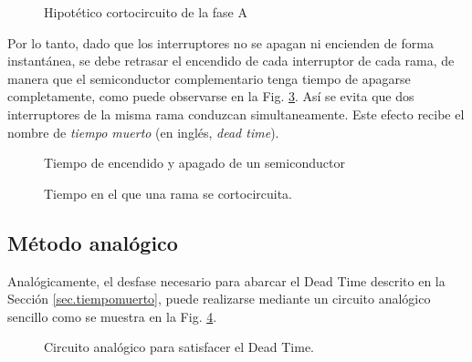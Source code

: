 \documentclass{report}
\begin{document}
\begin{figure}[ht]
    \begin{center}
    \end{center}
    \caption{Hipotético cortocircuito de la fase A}
    \label{fig.cortocircuitodefases}
    \end{figure}
    
Por lo tanto, dado que los interruptores no se apagan ni encienden de forma instantánea, se debe retrasar el encendido de cada interruptor de cada rama, de manera que el semiconductor complementario tenga tiempo de apagarse completamente, como puede observarse en la Fig. \ref{fig.cortocircuitodefasesdeadtime}. Así se evita que dos interruptores de la misma rama conduzcan simultaneamente. Este efecto recibe el nombre de \textit{tiempo muerto} (en inglés, \textit{dead time}).

\begin{figure}[!h]
\begin{center}
\end{center}
\caption{Tiempo de encendido y apagado de un semiconductor} \label{fig.deadtime}
\end{figure}

\begin{figure}[!h]
\begin{center}
\end{center}
\caption{Tiempo en el que una rama se cortocircuita.}
\label{fig.cortocircuitodefasesdeadtime}
\end{figure}



\subsection{Método analógico} \label{sec.metodoanalogico}
Analógicamente, el desfase necesario para abarcar el Dead Time descrito en la Sección \ref{sec.tiempomuerto}, puede realizarse mediante un circuito analógico sencillo como se muestra en la Fig. \ref{fig.metodoanalogico}.

\begin{figure}[!h]
\begin{center}
\end{center}
\caption{Circuito analógico para satisfacer el Dead Time.}
\label{fig.metodoanalogico}
\end{figure}
\end{document}
